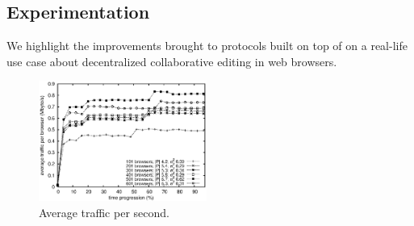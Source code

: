 
\subsection{Experimentation}
\label{subsec:experiments2}

We highlight the improvements brought to protocols built on top of \SPRAY on a
real-life use case about decentralized collaborative editing in web browsers.



\begin{figure}
  \centering
  \includegraphics[width=0.49\textwidth]{img/traffic.eps}
  \caption{\label{fig:traffic}Average traffic per second.}
\end{figure}

